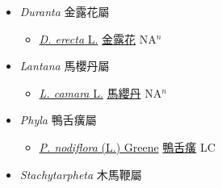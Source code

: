 
  \begin{itemize}
 \item[] \textit{Duranta} 金露花屬
                    
  \begin{itemize}
        \item[] \href{http://www.theplantlist.org/tpl1.1/search?q=Duranta+erecta}{\textit{D. erecta} L.}   \href{\detokenize{http://taibnet.sinica.edu.tw/chi/taibnet_species_list.php?T2=金露花&T2_new_value=true&fr=y}}{金露花} NA$^n$
  \end{itemize}
 \item[] \textit{Lantana} 馬櫻丹屬
                    
  \begin{itemize}
        \item[] \href{http://www.theplantlist.org/tpl1.1/search?q=Lantana+camara}{\textit{L. camara} L.}   \href{\detokenize{http://taibnet.sinica.edu.tw/chi/taibnet_species_list.php?T2=馬纓丹&T2_new_value=true&fr=y}}{馬纓丹} NA$^n$
  \end{itemize}
 \item[] \textit{Phyla} 鴨舌癀屬
                    
  \begin{itemize}
        \item[] \href{http://www.theplantlist.org/tpl1.1/search?q=Phyla+nodiflora}{\textit{P. nodiflora} (L.) Greene}   \href{\detokenize{http://taibnet.sinica.edu.tw/chi/taibnet_species_list.php?T2=鴨舌癀&T2_new_value=true&fr=y}}{鴨舌癀} LC
  \end{itemize}
 \item[] \textit{Stachytarpheta} 木馬鞭屬
                    

\end{itemize}

